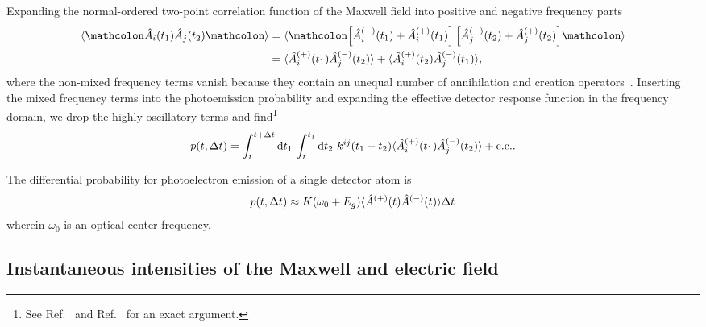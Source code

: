 Expanding the normal-ordered two-point correlation function of the Maxwell field into positive and negative frequency parts
\begin{equation}
	\begin{split}
		\expval{
			\norder{
				\hat{A}_i(t_1)
				\hat{A}_j(t_2)
			}
		}
		&=
		\expval{
			\norder{
				\left[
					\hat{A}_i^{(-)}(t_1)
					+
					\hat{A}_i^{(+)}(t_1)
				\right]
				\left[
					\hat{A}_j^{(-)}(t_2)
					+
					\hat{A}_j^{(+)}(t_2)
				\right]
			}
		}
		\\
		&=
		\expval{
			\hat{A}_i^{(+)}(t_1)
			\hat{A}_j^{(-)}(t_2)
		}
		+
		\expval{
			\hat{A}_i^{(+)}(t_2)
			\hat{A}_j^{(-)}(t_1)
		}
		,
	\end{split}
\end{equation}
where the non-mixed frequency terms vanish because they contain an unequal number of annihilation and creation operators~\cite[p.~134]{Cohen1992}.
Inserting the mixed frequency terms into the photoemission probability and expanding the effective detector response function in the frequency domain, we drop the highly oscillatory terms and find\footnote{See Ref.~\cite[p.~697]{Mandel1995} and Ref.~\cite[p.~136]{Cohen1992} for an exact argument.}
\begin{equation}
	p(t,\Delta t)
	=
	\int_t^{t+\Delta t}\dd{t_1}
	\int_t^{t_1}
	\dd{t_2}
	k^{ij}(t_1-t_2)
	\expval{
		\hat{A}_i^{(+)}(t_1)
		\hat{A}_j^{(-)}(t_2)
	}
	+
	\text{c.c.}
	.
\end{equation}



The differential probability for photoelectron emission of a single detector atom is~\cite{Kimble1984}
\begin{equation}
	p(t,\Delta t)
	\approx
	K(\omega_0+E_g)
	\langle
		\hat{A}^{(+)}(t)
		\hat{A}^{(-)}(t)
	\rangle
	\Delta t
	\label{eq:differential_photoemission_probability}
\end{equation}
wherein $\omega_0$ is an optical center frequency.

\subsection{Instantaneous intensities of the Maxwell and electric field}

